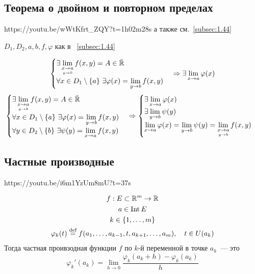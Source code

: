 \documentclass[../main.tex]{subfiles}
\begin{document}
\subsection{Теорема о двойном и повторном пределах}
https://youtu.be/wWtKfrt\_ZQY?t=1h02m28s а также см.~\ref{subsec:1.44}

$D_1, D_2, a, b, f, \varphi$ как в ~\ref{subsec:1.44}

\begin{equation*}
    \begin{cases}
        \exists \lim\limits_{\underset{y \to b}{x \to a}}f(x,y)=A \in \bar{\mathbb{R}} \\
        \forall x \in D_1 \setminus \{a\}\ \exists \varphi(x)=\lim\limits_{y \to b} f(x,y)
    \end{cases}
    \Rightarrow
    \exists \lim\limits_{x \to a} \varphi(x)
\end{equation*}
\begin{equation*}
    \begin{cases}
        \exists \lim\limits_{\underset{y \to b}{x \to a}}f(x,y)=A \in \bar{\mathbb{R}} \\
        \forall x \in D_1 \setminus \{a\}\ \exists \varphi(x)=\lim\limits_{y \to b} f(x,y)\\
        \forall y \in D_2 \setminus \{b\}\ \exists \psi(y)=\lim\limits_{x \to a} f(x,y)
    \end{cases}
    \Rightarrow
    \begin{cases}
        \exists \lim\limits_{x \to a} \varphi(x) \\
        \exists \lim\limits_{y \to b} \psi(y) \\
        \lim\limits_{x \to a} \varphi(x) = \lim\limits_{y \to b} \psi(y) = 
        \lim\limits_{\underset{y \to b}{x \to a}}f(x,y)
    \end{cases}
\end{equation*}

\subsection{Частные производные}
https://youtu.be/i6m1YzUm8mU?t=37s

\begin{gather*}
    f: E \subset \mathbb{R}^m \to \mathbb{R} \\
    a \in \operatorname{Int}E \\
    k \in \{1, \dots, m\} \\
   \varphi_k(t)\overset{\text{def}}{=}f(a_1, \dots, a_{k-1}, t, a_{k+1}, \dots, a_m),
   \quad  t \in U(a_k) 
\end{gather*}
Тогда частная проивзодная функции $f$ по $k$-й переменной в точке $a_k$~--- это
\begin{equation*}
   \varphi_k'(a_k)=\lim_{h \to 0}\frac{\varphi_k(a_k + h) - \varphi_k(a_k)}{h}
\end{equation*}
\end{document}
